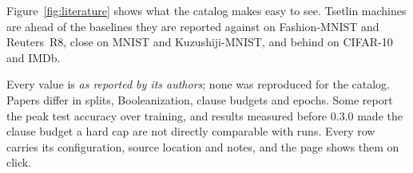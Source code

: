 Figure~\ref{fig:literature} shows what the catalog makes easy to see. Tsetlin machines are
ahead of the baselines they are reported against on Fashion-MNIST and Reuters~R8, close on
MNIST and Kuzushiji-MNIST, and behind on CIFAR-10 and IMDb.

\begin{ttcallout}
Every value is \emph{as reported by its authors}; none was reproduced for the catalog. Papers
differ in splits, Booleanization, clause budgets and epochs. Some report the peak test
accuracy over training, and results measured before 0.3.0 made the clause budget a hard cap
are not directly comparable with \ttlibname runs. Every row carries its configuration, source
location and notes, and the page shows them on click.
\end{ttcallout}
